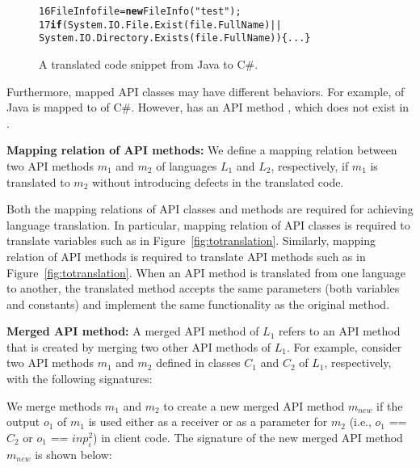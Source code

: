 \begin{figure}[t]
\begin{CodeOut}\vspace*{-1ex}
\begin{alltt}
16  FileInfo file = \textbf{new} FileInfo("test");
17   \textbf{if}(System.IO.File.Exist(file.FullName)||
       System.IO.Directory.Exists(file.FullName))\{...\}
\end{alltt}
\end{CodeOut}\vspace*{-4ex}
\caption{\label{fig:translatedcode} A translated code snippet from
Java to C\#.}\vspace*{-3ex}
\end{figure}

Furthermore, mapped API classes may have different behaviors. For
example,  of Java is mapped to
 of C\#. However,  has
an API method , which does not exist in
.

\textbf{Mapping relation of API methods:} We define a mapping relation
between two API methods $m_1$ and $m_2$ of languages $L_1$ and $L_2$,
respectively, if $m_1$ is translated to $m_2$ without introducing defects
in the translated code.

Both the mapping relations of API classes and methods are required
for achieving language translation. In particular, mapping relation
of API classes is required to translate variables such as
 in Figure~\ref{fig:totranslation}. Similarly, mapping
relation of API methods is required to translate API methods such as
 in Figure~\ref{fig:totranslation}. When an API
method is translated from one language to another, the translated
method accepts the same parameters (both variables and constants)
and implement the same functionality as the original method.

\textbf{Merged API method:} A merged API method of $L_1$ refers to
an API method that is created by merging two other API methods of
$L_1$. For example, consider two API methods $m_1$ and $m_2$ defined
in classes $C_1$ and $C_2$ of $L_1$, respectively, with the
following signatures:



We merge methods $m_1$ and $m_2$ to create a new merged API method $m_{new}$ if the
output $o_1$ of $m_1$ is used either as a receiver or as a
parameter for $m_2$ (i.e., $o_1$ == $C_2$ or $o_1$ == $inp_i^2$)
in client code. The signature of the new merged API method $m_{new}$ is
shown below:


